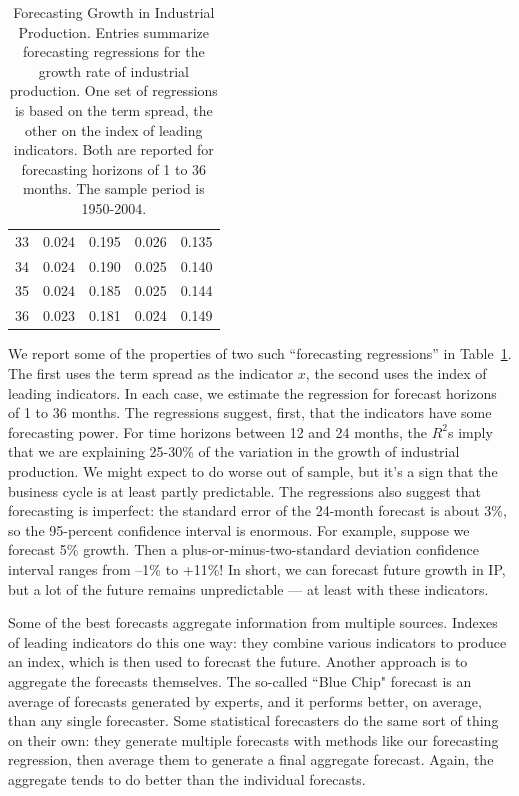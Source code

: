 \documentclass[letterpaper,12pt]{article}
\begin{document}
\begin{table}
\begin{center}
\begin{tabular}{ccccc}
         33         &         0.024               &    0.195  &            0.026                  & 0.135\\
         34        &         0.024               &    0.190  &            0.025                  & 0.140\\
         35        &         0.024               &    0.185  &            0.025                 & 0.144\\
         36        &         0.023               &    0.181  &            0.024                  & 0.149\\
\hline\hline
\end{tabular}
\end{center}
\caption{Forecasting Growth in Industrial Production.  Entries
summarize forecasting regressions for the growth rate of
industrial production. One set of regressions is based on the term
spread, the other on the index of leading indicators.  Both are
reported for forecasting horizons of 1 to 36 months.  The sample
period is 1950-2004.}

\label{tab:forecast}
\end{table}


We report some of the properties of two such ``forecasting
regressions'' in Table~\ref{tab:forecast}. The first uses the term
spread as the indicator $x$, the second uses the index of leading
indicators. In each case, we estimate the regression for forecast
horizons of 1 to 36 months. The regressions suggest, first, that
the indicators have some forecasting power.  For time horizons
between 12 and 24 months, the $R^2$s imply that we are explaining
25-30\% of the variation in the growth of industrial production.
We might expect to do worse out of sample, but it's a sign that
the business cycle is at least partly predictable.  The
regressions also suggest that forecasting is imperfect:  the
standard error of the 24-month forecast is about 3\%, so the
95-percent confidence interval is enormous. For example, suppose
we forecast 5\% growth.  Then a plus-or-minus-two-standard
deviation confidence interval ranges from --1\% to +11\%! In
short, we can forecast future growth in IP, but a lot of the
future remains unpredictable --- at least with these indicators.


Some of the best forecasts aggregate information from multiple
sources.  Indexes of leading indicators do this one way:  they
combine various indicators to produce an index, which is then used
to forecast the future.  Another approach is to aggregate the
forecasts themselves.  The so-called ``Blue Chip" forecast is an
average of forecasts generated by experts, and it performs better,
on average, than any single forecaster.  Some statistical
forecasters do the same sort of thing on their own:  they generate
multiple forecasts with methods like our forecasting regression,
then average them to generate a final aggregate forecast. Again,
the aggregate tends to do better than the individual forecasts.
\end{document}
